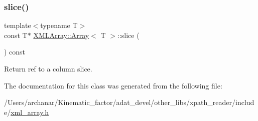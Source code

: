 \subsubsection{\texorpdfstring{slice()}{slice()}\hspace{0.1cm}{\footnotesize\ttfamily [2/2]}}
{\footnotesize\ttfamily template$<$typename T$>$ \\
const T$\ast$ \mbox{\hyperlink{classXMLArray_1_1Array}{X\+M\+L\+Array\+::\+Array}}$<$ T $>$\+::slice (\begin{DoxyParamCaption}{ }\end{DoxyParamCaption}) const\hspace{0.3cm}{\ttfamily [inline]}}



Return ref to a column slice. 



The documentation for this class was generated from the following file\+:\begin{DoxyCompactItemize}
\item 
/\+Users/archanar/\+Kinematic\+\_\+factor/adat\+\_\+devel/other\+\_\+libs/xpath\+\_\+reader/include/\mbox{\hyperlink{other__libs_2xpath__reader_2include_2xml__array_8h}{xml\+\_\+array.\+h}}\end{DoxyCompactItemize}
